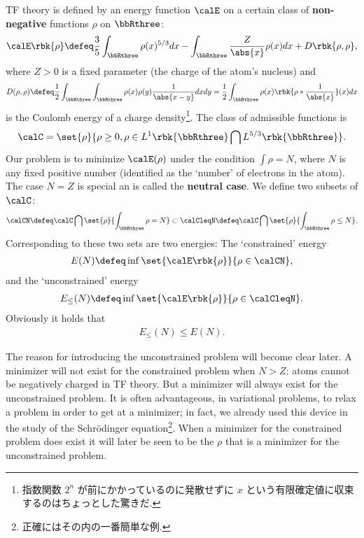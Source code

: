 \documentclass[openany, a4paper, oneside]{jsbook}
\begin{document}
TF theory is defined by an energy function $\calE$ on a certain class of \textbf{non-negative} functions $\rho$ on $\bbRthree$:
\begin{align}
 \calE \rbk{\rho}
 \defeq
 \frac{3}{5} \int_{\bbRthree} \rho (x)^{5/3} dx - \int_{\bbRthree} \frac{Z}{\abs{x}} \rho (x) dx + D \rbk{\rho, \rho}, \label{Lieb-Loss_Analysis_chap11_17}
\end{align}
where $Z > 0$ is a fixed parameter (the charge of the atom's nucleus) and
\begin{align}
 D (\rho, \rho)
 \defeq
 \frac{1}{2} \int_{\bbRthree} \int_{\bbRthree} \rho (x) \rho (y) \frac{1}{\abs{x - y}} dx dy
 =
 \frac{1}{2} \int_{\bbRthree} \rho (x) \rbk{\rho * \frac{1}{\abs{x}}}(x) dx
\end{align}
is the Coulomb energy of a charge density\footnote{指数関数 $2^n$ が前にかかっているのに発散せずに $x$ という有限確定値に収束するのはちょっとした驚きだ.}.
The class of admissible functions is
\begin{align}
 \calC
 =
 \set{\rho}{\rho \geq 0, \rho \in L^1 \rbk{\bbRthree} \bigcap L^{5/3} \rbk{\bbRthree}}.
\end{align}
Our problem is to minimize $\calE (\rho)$ under the condition $\int \rho = N$,
where $N$ is any fixed positive number (identified as the `number' of electrons in the atom).
The case $N=Z$ is special an is called the \textbf{neutral case}.
We define two subsets of $\calC$:
\begin{align}
 \calCN
 \defeq
 \calC \bigcap \set{\rho}{\int_{\bbRthree} \rho = N}
 \subset
 \calCleqN
 \defeq
 \calC \bigcap \set{\rho}{\int_{\bbRthree} \rho \leq N}.
\end{align}
Corresponding to these two sets are two energies: The `constrained' energy
\begin{align}
 E (N)
 \defeq
 \inf \set{\calE \rbk{\rho}}{\rho \in \calCN},
\end{align}
and the `unconstrained' energy
\begin{align}
 E_{\leq}(N)
 \defeq
 \inf \set{\calE \rbk{\rho}}{\rho \in \calCleqN}. \label{Lieb-Loss_Analysis_chap11_18}
\end{align}
Obviously it holds that
\begin{align}
 E_{\leq} (N)
 \leq
 E (N).
\end{align}

The reason for introducing the unconstrained problem will become clear later.
A minimizer will not exist for the constrained problem when $N > Z$:
atoms cannot be negatively charged in TF theory.
But a minimizer will always exist for the unconstrained problem.
It is often advantageous, in variational problems, to relax a problem in order to get at a minimizer;
in fact, we already used this device in the study of the Schr\"odinger equation\footnote{正確にはその内の一番簡単な例.}.
When a minimizer for the constrained problem does exist it will later be seen to be the $\rho$ that is
a minimizer for the unconstrained problem.
\end{document}
